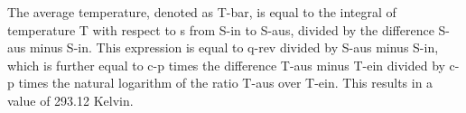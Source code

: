 The average temperature, denoted as T-bar, is equal to the integral of temperature T with respect to s from S-in to S-aus, divided by the difference S-aus minus S-in. This expression is equal to q-rev divided by S-aus minus S-in, which is further equal to c-p times the difference T-aus minus T-ein divided by c-p times the natural logarithm of the ratio T-aus over T-ein. This results in a value of 293.12 Kelvin.